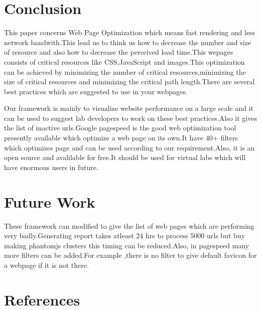 \documentclass[11pt]{article}
\begin{document}
\section{Conclusion}
\label{sec-7}

 This paper concerns Web Page Optimization which  means fast rendering and less network bandwith.This lead us to think us how to decrease the number and size of resource and also how to decrease the perceived load time.This wepages consists of critical resources like CSS,JavaScript and images.This optimization can be achieved by minimizing the number of critical resources,minimizing the size of critical resources and minimizing the critical path length.There are several best practices which are suggested to use in your webpages.

 Our framework is mainly to visualize website performance on a large scale and it can be used to suggest lab developers to work on these best practices.Also it gives the list of inactive urls.Google pagespeed is the good web optimization tool presently available which optimize a web page on its own.It have 40+ filters which optimizes page and can be used according to our requirement.Also, it is an open source and avalilable for free.It should be used for virtual labs which will have enormous users in future.
 
\section{Future Work}
\label{sec-8}

These framework can modified to give the list of web pages which are performing very badly.Generating report takes atleast 24 hrs to process 5000 urls but buy making phantomjs clusters this timing can be reduced.Also, in pagespeed many more filters can be added.For example ,there is no filter to give default favicon for a webpage if it is not there.
\section{References}
\label{sec-9}
\end{document}
